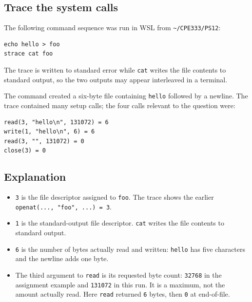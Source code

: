 \documentclass[a4paper,11pt]{article}
\begin{document}
\subsection{Trace the system calls}
The following command sequence was run in WSL from
\texttt{\textasciitilde/CPE333/PS12}:
\begin{lstlisting}
echo hello > foo
strace cat foo
\end{lstlisting}
The trace is written to standard error while \texttt{cat} writes the file
contents to standard output, so the two outputs may appear interleaved in a
terminal.

The command created a six-byte file containing \texttt{hello} followed by a
newline. The trace contained many setup calls; the four calls relevant to the
question were:
\begin{lstlisting}
read(3, "hello\n", 131072) = 6
write(1, "hello\n", 6) = 6
read(3, "", 131072) = 0
close(3) = 0
\end{lstlisting}

\subsection{Explanation}
\begin{itemize}
  \item \texttt{3} is the file descriptor assigned to \texttt{foo}. The trace
  shows the earlier \texttt{openat(..., "foo", ...) = 3}.
  \item \texttt{1} is the standard-output file descriptor. \texttt{cat} writes
  the file contents to standard output.
  \item \texttt{6} is the number of bytes actually read and written:
  \texttt{hello} has five characters and the newline adds one byte.
  \item The third argument to \texttt{read} is its requested byte count:
  \texttt{32768} in the assignment example and \texttt{131072} in this run.
  It is a maximum, not the amount actually read. Here \texttt{read} returned
  \texttt{6} bytes, then \texttt{0} at end-of-file.
\end{itemize}
\end{document}
